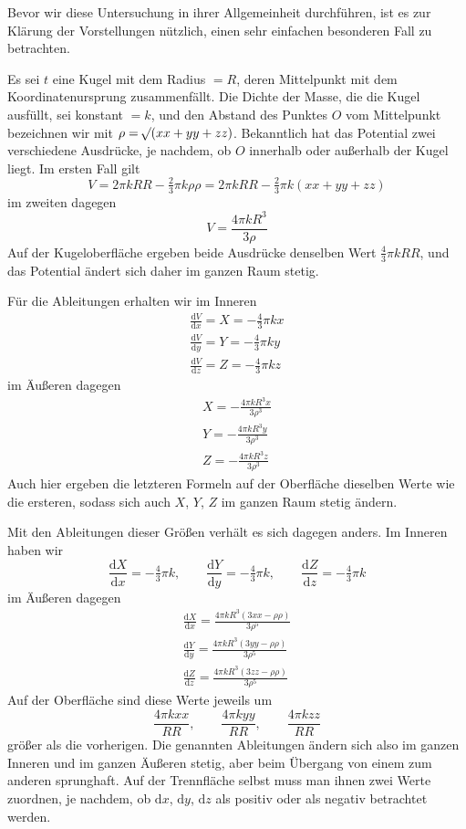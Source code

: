 Bevor wir diese Untersuchung in ihrer Allgemeinheit durchführen, ist es zur Klärung der Vorstellungen nützlich, einen sehr einfachen besonderen Fall zu betrachten.

Es sei $t$ eine Kugel mit dem Radius $=R$, deren Mittelpunkt mit dem Koordinatenursprung zusammenfällt. Die Dichte der Masse, die die Kugel ausfüllt, sei konstant $=k$, und den Abstand des Punktes $O$ vom Mittelpunkt bezeichnen wir mit $\rho=\mathord{{}^{}\!\surd}(xx+yy+zz)$. Bekanntlich hat das Potential zwei verschiedene Ausdrücke, je nachdem, ob $O$ innerhalb oder außerhalb der Kugel liegt. Im ersten Fall gilt
\[
V=2\pi kRR-\tfrac{2}{3}\pi k\rho\rho=2\pi kRR-\tfrac{2}{3}\pi k(xx+yy+zz)
\]
im zweiten dagegen
\[
V=\frac{4\pi kR^3}{3\rho}
\]
Auf der Kugeloberfläche ergeben beide Ausdrücke denselben Wert $\tfrac{4}{3}\pi kRR$, und das Potential ändert sich daher im ganzen Raum stetig.

Für die Ableitungen erhalten wir im Inneren
\[
\begin{array}{l}
\displaystyle\frac{\mathrm{d}V}{\mathrm{d}x}=X=-\tfrac{4}{3}\pi kx\\[6pt]
\displaystyle\frac{\mathrm{d}V}{\mathrm{d}y}=Y=-\tfrac{4}{3}\pi ky\\[6pt]
\displaystyle\frac{\mathrm{d}V}{\mathrm{d}z}=Z=-\tfrac{4}{3}\pi kz
\end{array}
\]
im Äußeren dagegen
\[
\begin{array}{l}
\displaystyle X=-\frac{4\pi kR^3x}{3\rho^3}\\[6pt]
\displaystyle Y=-\frac{4\pi kR^3y}{3\rho^3}\\[6pt]
\displaystyle Z=-\frac{4\pi kR^3z}{3\rho^3}
\end{array}
\]
Auch hier ergeben die letzteren Formeln auf der Oberfläche dieselben Werte wie die ersteren, sodass sich auch $X$, $Y$, $Z$ im ganzen Raum stetig ändern.

Mit den Ableitungen dieser Größen verhält es sich dagegen anders. Im Inneren haben wir
\[
\frac{\mathrm{d}X}{\mathrm{d}x}=-\tfrac{4}{3}\pi k,\qquad \frac{\mathrm{d}Y}{\mathrm{d}y}=-\tfrac{4}{3}\pi k,\qquad \frac{\mathrm{d}Z}{\mathrm{d}z}=-\tfrac{4}{3}\pi k
\]
im Äußeren dagegen
\[
\begin{array}{l}
\displaystyle\frac{\mathrm{d}X}{\mathrm{d}x}=\frac{4\pi kR^3(3xx-\rho\rho)}{3\rho^5}\\[6pt]
\displaystyle\frac{\mathrm{d}Y}{\mathrm{d}y}=\frac{4\pi kR^3(3yy-\rho\rho)}{3\rho^5}\\[6pt]
\displaystyle\frac{\mathrm{d}Z}{\mathrm{d}z}=\frac{4\pi kR^3(3zz-\rho\rho)}{3\rho^5}
\end{array}
\]
Auf der Oberfläche sind diese Werte jeweils um
\[
\frac{4\pi kxx}{RR},\qquad \frac{4\pi kyy}{RR},\qquad \frac{4\pi kzz}{RR}
\]
größer als die vorherigen. Die genannten Ableitungen ändern sich also im ganzen Inneren und im ganzen Äußeren stetig, aber beim Übergang von einem zum anderen sprunghaft. Auf der Trennfläche selbst muss man ihnen zwei Werte zuordnen, je nachdem, ob $\mathrm{d}x$, $\mathrm{d}y$, $\mathrm{d}z$ als positiv oder als negativ betrachtet werden.

